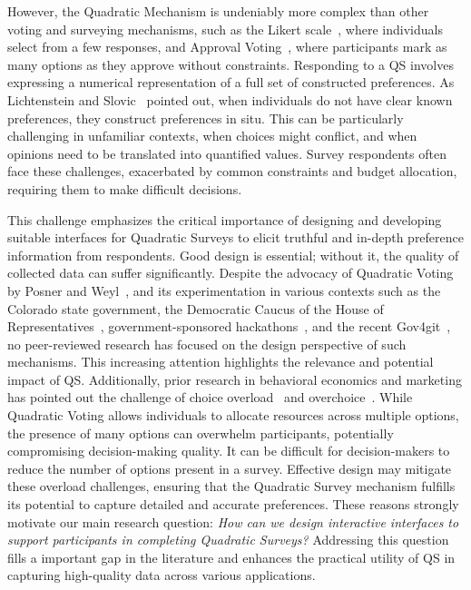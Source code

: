 However, the Quadratic Mechanism is undeniably more complex than other voting and surveying mechanisms, such as the Likert scale~\cite{likertTechniqueMeasurementAttitudes1932}, where individuals select from a few responses, and Approval Voting~\cite{bramsApprovalVoting1978}, where participants mark as many options as they approve without constraints. Responding to a QS involves expressing a numerical representation of a full set of constructed preferences. As Lichtenstein and Slovic~\cite{lichtensteinConstructionPreference2006} pointed out, when individuals do not have clear known preferences, they construct preferences in situ. This can be particularly challenging in unfamiliar contexts, when choices might conflict, and when opinions need to be translated into quantified values. Survey respondents often face these challenges, exacerbated by common constraints and budget allocation, requiring them to make difficult decisions.

This challenge emphasizes the critical importance of designing and developing suitable interfaces for Quadratic Surveys to elicit truthful and in-depth preference information from respondents. Good design is essential; without it, the quality of collected data can suffer significantly. Despite the advocacy of Quadratic Voting by Posner and Weyl~\cite{posner2018radical}, and its experimentation in various contexts such as the Colorado state government, the Democratic Caucus of the House of Representatives~\cite{QuadraticVotingColorado}, government-sponsored hackathons~\cite{teamTaiwanDigitalMinister}, and the recent Gov4git~\cite{Gov4gitDecentralizedPlatform2023}, no peer-reviewed research has focused on the design perspective of such mechanisms. This increasing attention highlights the relevance and potential impact of QS. Additionally, prior research in behavioral economics and marketing has pointed out the challenge of choice overload~\cite{iyengarWhenChoiceDemotivating2000} and overchoice~\cite{gourvilleOverchoiceAssortmentType2005}. While Quadratic Voting allows individuals to allocate resources across multiple options, the presence of many options can overwhelm participants, potentially compromising decision-making quality. It can be difficult for decision-makers to reduce the number of options present in a survey. Effective design may mitigate these overload challenges, ensuring that the Quadratic Survey mechanism fulfills its potential to capture detailed and accurate preferences. These reasons strongly motivate our main research question: \textit{How can we design interactive interfaces to support participants in completing Quadratic Surveys?} Addressing this question fills a important gap in the literature and enhances the practical utility of QS in capturing high-quality data across various applications.

